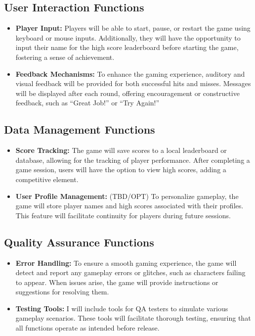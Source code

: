 \documentclass{article}
\begin{document}
\subsection{User Interaction Functions}
\begin{itemize}
    \item \textbf{Player Input:} Players will be able to start, pause, or restart the game using keyboard or mouse inputs. Additionally, they will have the opportunity to input their name for the high score leaderboard before starting the game, fostering a sense of achievement.
    \item \textbf{Feedback Mechanisms:} To enhance the gaming experience, auditory and visual feedback will be provided for both successful hits and misses. Messages will be displayed after each round, offering encouragement or constructive feedback, such as “Great Job!” or “Try Again!”
\end{itemize}

\subsection{Data Management Functions}
\begin{itemize}
    \item \textbf{Score Tracking:} The game will save scores to a local leaderboard or database, allowing for the tracking of player performance. After completing a game session, users will have the option to view high scores, adding a competitive element.
    \item \textbf{User Profile Management:} (TBD/OPT) To personalize gameplay, the game will store player names and high scores associated with their profiles. This feature will facilitate continuity for players during future sessions.
\end{itemize}

\subsection{Quality Assurance Functions}
\begin{itemize}
    \item \textbf{Error Handling:} To ensure a smooth gaming experience, the game will detect and report any gameplay errors or glitches, such as characters failing to appear. When issues arise, the game will provide instructions or suggestions for resolving them.
    \item \textbf{Testing Tools:} I will include tools for QA testers to simulate various gameplay scenarios. These tools will facilitate thorough testing, ensuring that all functions operate as intended before release.
\end{itemize}
\end{document}
